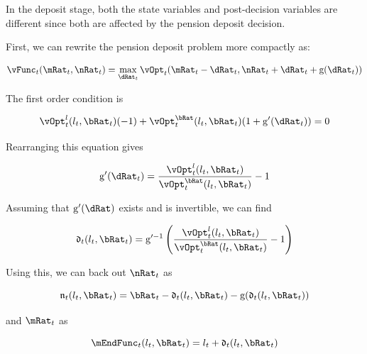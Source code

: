\documentclass[\econtexRoot/SequentialEGM]{subfiles}
\begin{document}
\providecommand{\gFunc}{\ensuremath{\mathrm{g}}}

In the deposit stage, both the state variables and post-decision variables are different since both are affected by the pension deposit decision.

First, we can rewrite the pension deposit problem more compactly as:

\begin{equation}
  \vFunc_{t}(\mRat_{t}, \nRat_{t}) = \max_{\dRat_{t}}
  \vOpt_{t}(\mRat_{t}
  - \dRat_{t}, \nRat_{t} + \dRat_{t} + \gFunc(\dRat_{t}))
\end{equation}

The first order condition is

\begin{equation}
  \vOpt_{t}^{\lRat}(\lRat_{t}, \bRat_{t})(-1) +
  \vOpt_{t}^{\bRat}(\lRat_{t}, \bRat_{t})(1+\gFunc'(\dRat_{t})) = 0
\end{equation}

Rearranging this equation gives

\begin{equation}
  \gFunc'(\dRat_{t}) = \frac{\vOpt_{t}^{\lRat}(\lRat_{t},
    \bRat_{t})}{\vOpt_{t}^{\bRat}(\lRat_{t}, \bRat_{t})} - 1
\end{equation}

Assuming that $\gFunc'(\dRat)$ exists and is invertible, we can find

\providecommand{\dEndFunc}{\ensuremath{\mathfrak{d}}}

\begin{equation}
  \dEndFunc_{t}(\lRat_{t}, \bRat_{t}) = \gFunc'^{-1}\left(
  \frac{\vOpt_{t}^{\lRat}(\lRat_{t},
    \bRat_{t})}{\vOpt_{t}^{\bRat}(\lRat_{t},
    \bRat_{t})} - 1 \right)
\end{equation}

Using this, we can back out $\nRat_{t}$ as

\providecommand{\nEndFunc}{\ensuremath{\mathfrak{n}}}

\begin{equation}
  \nEndFunc_{t}(\lRat_{t}, \bRat_{t}) = \bRat_{t} -
  \dEndFunc_{t}(\lRat_{t}, \bRat_{t}) - \gFunc(\dEndFunc_{t}(\lRat_{t},
    \bRat_{t}))
\end{equation}

and $\mRat_{t}$ as

\begin{equation}
  \mEndFunc_{t}(\lRat_{t}, \bRat_{t}) = \lRat_{t} +
  \dEndFunc_{t}(\lRat_{t}, \bRat_{t})
\end{equation}
\end{document}
